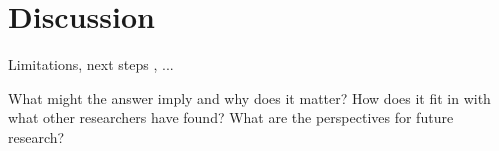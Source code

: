 \chapter{Discussion}

Limitations, next steps , ...

What might the answer imply and why does it matter? How does it fit in with what other researchers have found? What are the perspectives for future research?
